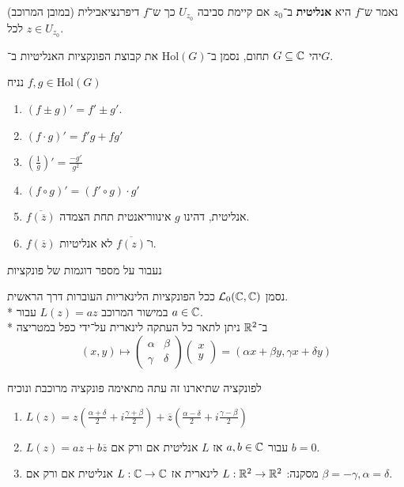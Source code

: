 \begin{definition}
	נאמר ש־$f$ היא \textbf{אנליטית} ב־$z_0$ אם קיימת סביבה $U_{z_0}$ כך ש־$f$ דיפרנציאבילית (במובן המרוכב) לכל $z \in U_{z_0}$.
\end{definition}
\begin{notation}
	יהי $G \subseteq \mathbb{C}$ תחום, נסמן ב־$\text{Hol}(G)$ את קבוצת הפונקציות האנליטיות ב־$G$.
\end{notation}
\begin{proposition}
	נניח $f, g \in \text{Hol}(G)$
	\begin{enumerate}
		\item $(f \pm g)' = f' \pm g'$.
		\item $(f \cdot g)' = f'g + fg'$
		\item $(\frac{1}{g})' = \frac{-g'}{g^2}$
		\item $(f \circ g)' = (f' \circ g) \cdot g'$
		\item $\overline{f(\overline{z})}$ אנליטית, דהינו $g$ אינווריאנטית תחת הצמדה.
		\item $f(\overline{z})$ ו־$\overline{f(z)}$ לא אנליטיות.
	\end{enumerate}
\end{proposition}
נעבור על מספר דוגמות של פונקציות
\begin{example}
	נסמן $\mathcal{L}_0(\mathbb{C}, \mathbb{C})$ ככל הפונקציות הלינאריות העוברות דרך הראשית. \\*
	במישור המרוכב $L(z) = a z$ עבור $a \in \mathbb{C}$. \\*
	ב־$\mathbb{R}^2$ ניתן לתאר כל העתקה לינארית על־ידי כפל במטריצה
	\[
		(x, y) \mapsto \begin{pmatrix}
			\alpha & \beta \\
			\gamma & \delta
		\end{pmatrix}
		\begin{pmatrix}
			x \\ y
		\end{pmatrix}
		= (\alpha x + \beta y, \gamma x + \delta y)
	\]
\end{example}
\begin{exercise}
	לפונקציה שתיארנו זה עתה מתאימה פונקציה מרוכבת ונוכיח
	\begin{enumerate}
		\item $L(z) = z ( \frac{\alpha + \delta}{2} + i \frac{\gamma + \beta}{2}) + \overline{z} ( \frac{\alpha - \delta}{2} + i \frac{\gamma - \beta}{2})$
		\item $L(z) = az + b\overline{z}$ עבור $a, b \in \mathbb{C}$ אז $L$ אנליטית אם ורק אם $b = 0$.
		\item מסקנה: $L : \mathbb{R}^2 \to \mathbb{R}^2$ לינארית אז $L : \mathbb{C} \to \mathbb{C}$ אנליטית אם ורק אם $\beta = -\gamma, \alpha = \delta$.
	\end{enumerate}
\end{exercise}

